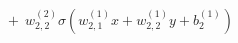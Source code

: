 \documentclass[preview]{standalone}
\begin{document}
\begin{align*}
+ \ \ w_{2,2}^{(2)} \sigma(w_{2,1}^{(1)}x + w_{2,2}^{(1)}y +b_2^{(1)})
\end{align*}
\end{document}
